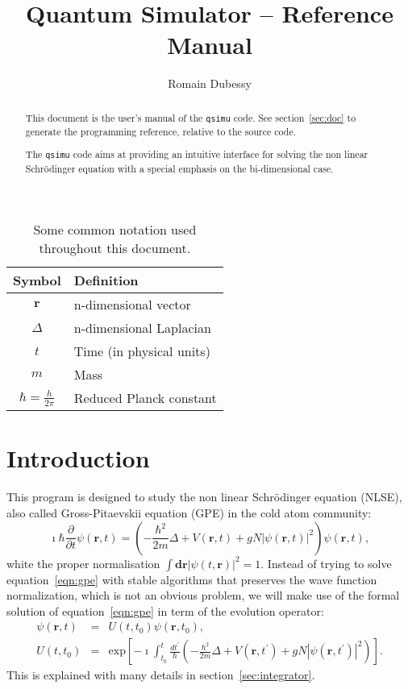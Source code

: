 \documentclass[12pt,a4paper]{report}
\author{Romain Dubessy}
\title{Quantum Simulator -- Reference Manual}
\newcommand{\abs}[1]{\left|#1\right|}
\newcommand{\qsimu}{\texttt{qsimu}{} }
\renewcommand{\exp}[1]{\textrm{exp}\left[#1\right]}
\begin{document}
\maketitle
\begin{abstract}
This document is the user's manual of the \qsimu code.
See section~\ref{sec:doc} to generate the programming reference, relative to the source code.

The \qsimu code aims at providing an intuitive interface for solving the non linear Schrödinger equation with a special emphasis on the bi-dimensional case.
\end{abstract}

\begin{table}
\begin{center}
\begin{tabular}{c|l}
Symbol & Definition \\\hline
$\bm{r}$ & n-dimensional vector\\
$\Delta$ & n-dimensional Laplacian\\
$t$ & Time (in physical units)\\
$m$ & Mass\\
$\hbar=\frac{h}{2\pi}$ & Reduced Planck constant\\
\hline
\end{tabular}
\caption{\label{tab:notations}Some common notation used throughout this document.}
\end{center}
\end{table}
\cleardoublepage
\tableofcontents
\chapter{Introduction}
This program is designed to study the non linear Schrödinger equation (NLSE), also called Gross-Pitaevskii equation (GPE) in the cold atom community:
\begin{equation}
\imath\hbar\frac{\partial}{\partial t}\psi(\bm{r},t)=\left(-\frac{\hbar^2}{2m}\Delta+V(\bm{r},t)+gN\abs{\psi(\bm{r},t)}^2\right)\psi(\bm{r},t),
\label{eqn:gpe}
\end{equation}
white the proper normalisation $\int \bm{dr}\abs{\psi(t,\bm{r})}^2=1$.
Instead of trying to solve equation~\eqref{eqn:gpe} with stable algorithms that preserves the wave function normalization, which is not an obvious problem, we will make use of the formal solution of equation~\eqref{eqn:gpe} in term of the evolution operator:
\begin{subequations}
\begin{eqnarray}
\psi(\bm{r},t)&=&U(t,t_0)\psi(\bm{r},t_0),\\
U(t,t_0)&=&\exp{-\imath\int_{t_0}^t\frac{dt^\prime}{\hbar}\left(-\frac{\hbar^2}{2m}\Delta+V(\bm{r},t^\prime)+gN\abs{\psi(\bm{r},t^\prime)}^2\right)}.
\label{eqn:evolution}
\end{eqnarray}
\end{subequations}
This is explained with many details in section~\ref{sec:integrator}.
\end{document}
